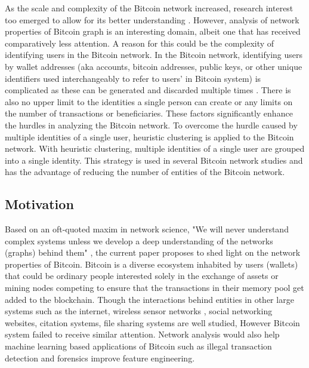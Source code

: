 \documentclass[preprint,12pt]{elsarticle}
\begin{document}
As the scale and complexity of the Bitcoin network increased, research interest too emerged to allow for its better understanding \cite{rahouti2018bitcoin, toyoda2019novel, alqassem2018anti, lee2019measurements, tschorsch2016bitcoin}. However, analysis of network properties of Bitcoin graph is an interesting domain, albeit one that has received comparatively less attention. A reason for this could be the complexity of identifying users in the Bitcoin network. In the Bitcoin network, identifying users by wallet addresses (aka accounts, bitcoin addresses, public keys, or other unique identifiers used interchangeably to refer to users' in Bitcoin system) is complicated as these can be generated and discarded multiple times \cite{alqassem2018anti}. There is also no upper limit to the identities a single person can create or any limits on the number of transactions or beneficiaries. These factors significantly enhance the hurdles in analyzing the Bitcoin network. To overcome the hurdle caused by multiple identities of a single user, heuristic clustering is applied to the Bitcoin network. With heuristic clustering, multiple identities of a single user are grouped into a single identity. This strategy is used in several Bitcoin network studies \cite{maesa2019bow, maesa2018graph, maesa2018data, maesa2016uncovering} and has the advantage of reducing the number of entities of the Bitcoin network. 

 

\subsection{Motivation}
Based on an oft-quoted maxim in network science, "We will never understand complex systems unless we develop a deep understanding of the networks (graphs) behind them" \cite{barabasi2016network}, the current paper proposes to shed light on the network properties of Bitcoin. Bitcoin is a diverse ecosystem inhabited by users (wallets) that could be ordinary people interested solely in the exchange of assets or mining nodes competing to ensure that the transactions in their memory pool get added to the blockchain. Though the interactions behind entities in other large systems such as the internet, wireless sensor networks \cite{fu2019message, fu2019wsns, fu2020environment}, social networking websites, citation systems, file sharing systems are well studied, However Bitcoin system failed to receive similar attention. Network analysis would also help machine learning based applications of Bitcoin such as illegal transaction detection and forensics improve feature engineering. 
\end{document}
